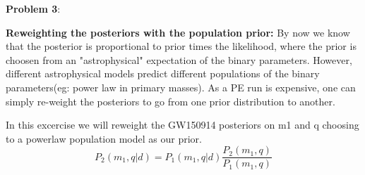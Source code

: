 \documentclass{article} %
\newcommand{\question}[2][]{\begin{flushleft}
        \textbf{Problem #1}: %
\end{flushleft}
}
\begin{document}
    \question[3]{} 
    \textbf{Reweighting the posteriors with the population prior:} By now we know that the posterior is proportional to prior times the likelihood, where the prior is choosen from an "astrophysical" expectation of the binary parameters. However, different astrophysical models predict different populations of the binary parameters(eg: power law in primary masses). As a PE run is expensive, one can simply re-weight the posteriors to go from one prior distribution to another.
   
In this excercise we will reweight the GW150914 posteriors on m1 and q choosing to a powerlaw population model as our prior.
\begin{equation}
 	P_2(m_1,q|d) = P_1(m_1,q|d) \frac{P_2(m_1,q)}{P_1(m_1,q)}
\end{equation}
\end{document}
